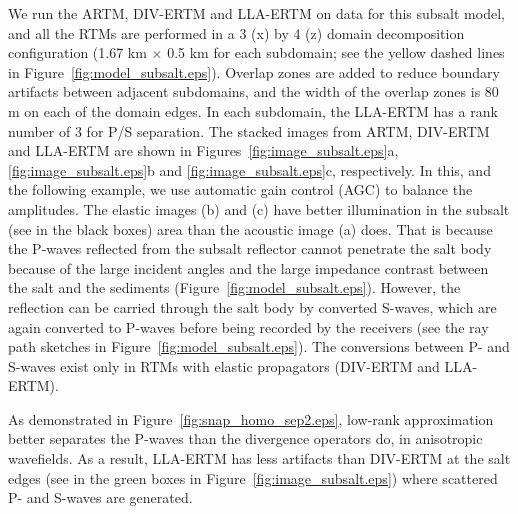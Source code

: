 \documentclass[manuscript,ulem,graphix,revised]{geophysics}
\begin{document}
We run the ARTM, DIV-ERTM and LLA-ERTM on data for this subsalt model, and all the RTMs are performed in a 3 (x) by 4 (z) domain decomposition configuration (1.67 km $\times$ 0.5 km for each subdomain; see the yellow dashed lines in Figure~\ref{fig:model_subsalt.eps}). Overlap zones are added to reduce boundary artifacts between adjacent subdomains, and the width of the overlap zones is 80 m on each of the domain edges. In each subdomain, the LLA-ERTM has a rank number of 3 for P/S separation.
The stacked images from ARTM, DIV-ERTM and LLA-ERTM are shown in Figures~\ref{fig:image_subsalt.eps}a, \ref{fig:image_subsalt.eps}b and \ref{fig:image_subsalt.eps}c, respectively. In this, and the following example, we use automatic gain control (AGC) to balance the amplitudes. The elastic images (b) and (c) have better illumination in the subsalt (see in the black boxes) area than the acoustic image (a) does. That is because the P-waves reflected from the subsalt reflector cannot penetrate the salt body because of the large incident angles and the large impedance contrast between the salt and the sediments (Figure~\ref{fig:model_subsalt.eps}). 
However, the reflection can be carried through the salt body by converted S-waves, which are again converted to P-waves before being recorded by the receivers
(see the ray path sketches in Figure~\ref{fig:model_subsalt.eps}). The conversions between P- and S-waves exist only in RTMs with elastic propagators (DIV-ERTM and LLA-ERTM). 

As demonstrated in Figure~\ref{fig:snap_homo_sep2.eps}, low-rank approximation better separates the P-waves than the divergence operators do, in anisotropic wavefields. As a result, LLA-ERTM has less artifacts than DIV-ERTM at the salt edges (see in the green boxes in Figure~\ref{fig:image_subsalt.eps}) where scattered P- and S-waves are generated.
\end{document}
